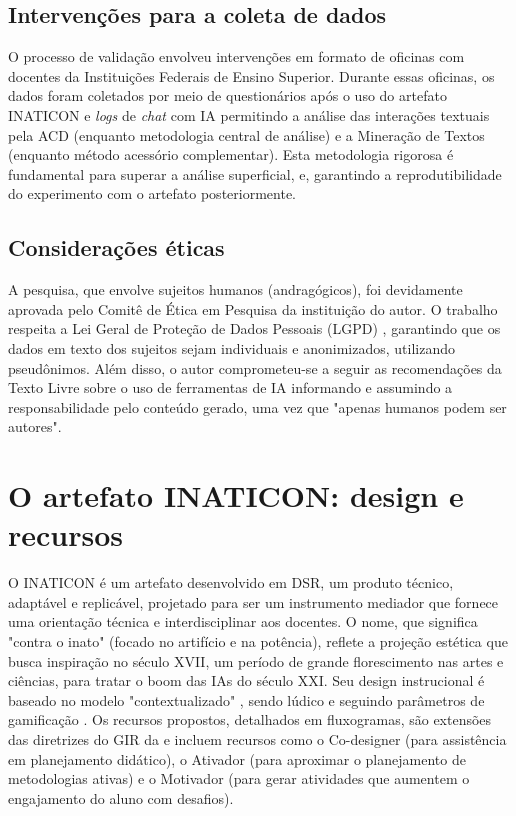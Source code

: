 \documentclass[portuguese]{textolivre}
\begin{document}
\subsection{Intervenções para a coleta de dados}\label{sec-titulo}
O processo de validação envolveu intervenções em formato de oficinas com docentes da Instituições Federais de Ensino Superior. Durante essas oficinas, os dados foram coletados por meio de questionários após o uso do artefato INATICON e \textit{logs} de \textit{chat} com IA permitindo a análise das interações textuais pela ACD (enquanto metodologia central de análise) e a Mineração de Textos (enquanto método acessório complementar). Esta metodologia rigorosa é fundamental para superar a análise superficial, e, garantindo a reprodutibilidade do experimento com o artefato posteriormente.

\subsection{Considerações éticas}\label{sec-autores}
A pesquisa, que envolve sujeitos humanos (andragógicos), foi devidamente aprovada pelo Comitê de Ética em Pesquisa da instituição do autor. O trabalho respeita a Lei Geral de Proteção de Dados Pessoais (LGPD) \cite{brasil2018lgpd}, garantindo que os dados em texto dos sujeitos sejam individuais e anonimizados, utilizando pseudônimos. Além disso, o autor comprometeu-se a seguir as recomendações da Texto Livre sobre o uso de ferramentas de IA informando e assumindo a responsabilidade pelo conteúdo gerado, uma vez que "apenas humanos podem ser autores".

\section{O artefato INATICON: design e recursos}\label{sec-idioma}
O INATICON é um artefato desenvolvido em DSR, um produto técnico, adaptável e replicável, projetado para ser um instrumento mediador que fornece uma orientação técnica e interdisciplinar aos docentes. O nome, que significa "contra o inato" (focado no artifício e na potência), reflete a projeção estética que busca inspiração no século XVII, um período de grande florescimento nas artes e ciências, para tratar o boom das IAs do século XXI. Seu design instrucional é baseado no modelo "contextualizado" \cite{filatro2010design}, sendo lúdico e seguindo parâmetros de gamificação \cite{carvalho2020livro}. Os recursos propostos, detalhados em fluxogramas, são extensões das diretrizes do GIR da \textcite{unesco2023chatgpt} e incluem recursos como o Co-designer (para assistência em planejamento didático), o Ativador (para aproximar o planejamento de metodologias ativas) e o Motivador (para gerar atividades que aumentem o engajamento do aluno com desafios).
\end{document}
